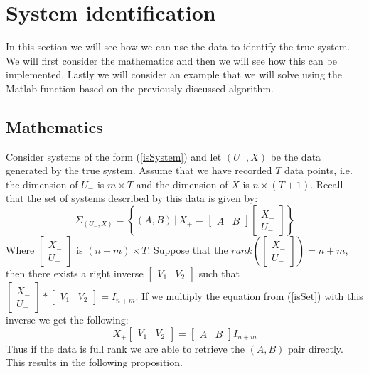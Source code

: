 \section{System identification}
In this section we will see how we can use the data to identify the true system. We will first consider the mathematics and then we will see how this can be implemented. Lastly we will consider an example that we will solve using the Matlab function based on the previously discussed algorithm.


\subsection{Mathematics}
Consider systems of the form (\ref{isSystem}) and let $(U_-,X)$ be the data generated by the true system. Assume that we have recorded $T$ data points, i.e. the dimension of $U_-$ is $m \times T$ and the dimension of $X$ is $n \times (T+1)$. Recall that the set of systems described by this data is given by:
\begin{equation}
	\label{isSet} 
	\Sigma_{(U_-,X)} = \left\{ (A, B) \, | \, X_{+} = \begin{bmatrix} A & B \end{bmatrix} \begin{bmatrix} X_{-} \\ U_{-} \end{bmatrix} \right\} 
\end{equation}
Where $\begin{bmatrix} X_{-} \\ U_{-} \end{bmatrix}$ is $(n+m) \times T$. Suppose that the $rank\left( \begin{bmatrix} X_{-} \\ U_{-} \end{bmatrix} \right) = n+m$, then there exists a right inverse $\begin{bmatrix} V_1 & V_2 \end{bmatrix}$ such that $\begin{bmatrix} X_{-} \\ U_{-} \end{bmatrix} * \begin{bmatrix} V_1 & V_2 \end{bmatrix} = I_{n+m}$. If we multiply the equation from (\ref{isSet}) with this inverse we get the following:
\begin{equation*}
	X_{+} \begin{bmatrix} V_1 & V_2 \end{bmatrix} = \begin{bmatrix} A & B \end{bmatrix} I_{n+m}
\end{equation*}
Thus if the data is full rank we are able to retrieve the $(A,B)$ pair directly. This results in the following proposition.

